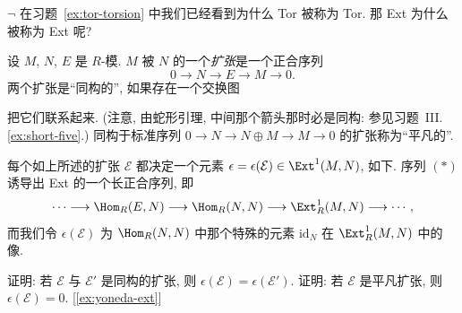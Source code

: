\begin{prob}\label{ex:ext-extensions}
$\neg$ 在习题~\ref{ex:tor-torsion} 中我们已经看到为什么 Tor 被称为 Tor. 那 Ext 为什么被称为 Ext 呢?

设 $M$, $N$, $E$ 是 $R$-模. $M$ 被 $N$ 的一个\emph{扩张}是一个正合序列
\begin{equation*}\tag{$*$}
0\longrightarrow N\longrightarrow E\longrightarrow M\longrightarrow 0.
\end{equation*}
两个扩张是``同构的'', 如果存在一个交换图
\begin{center}
\end{center}
把它们联系起来. (注意, 由蛇形引理, 中间那个箭头那时必是同构: 参见习题~III.\ref{ex:short-five}.) 同构于标准序列 $0\to N\to N\oplus M\to M\to 0$ 的扩张称为``平凡的''.

每个如上所述的扩张 $\mathcal{E}$ 都决定一个元素 $\epsilon=\epsilon(\mathcal{E})\in\Ext^1(M,N)$, 如下. 序列 $(*)$ 诱导出 Ext 的一个长正合序列, 即
\[
\cdots\longrightarrow\Hom_R(E,N)\longrightarrow\Hom_R(N,N)\longrightarrow\Ext_R^1(M,N)\longrightarrow\cdots,
\]
而我们令 $\epsilon(\mathcal{E})$ 为 $\Hom_R(N,N)$ 中那个特殊的元素 $\mathrm{id}_N$ 在 $\Ext_R^1(M,N)$ 中的像.

证明: 若 $\mathcal{E}$ 与 $\mathcal{E}'$ 是同构的扩张, 则 $\epsilon(\mathcal{E})=\epsilon(\mathcal{E}')$. 证明: 若 $\mathcal{E}$ 是平凡扩张, 则 $\epsilon(\mathcal{E})=0$. [\ref{ex:yoneda-ext}]
\end{prob}

